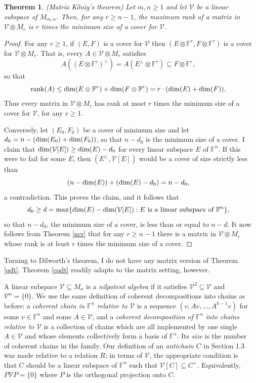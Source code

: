 \documentclass{amsart}
\newtheorem{thm}{Theorem}[section]
\theoremstyle{definition}
\begin{document}
\begin{thm}\label{mkt} (Matrix Kőnig's theorem)
Let $m,n \geq 1$ and let $\mathcal{V}$ be a linear subspace of $M_{m,n}$. Then, for any $r \geq n - 1$, the maximum rank of a matrix in $\mathcal{V} \otimes M_r$ is $r$ times the minimum size of a cover for $\mathcal{V}$.
\end{thm}

\begin{proof}
For any $r \geq 1$, if $(E,F)$ is a cover for $\mathcal{V}$ then $(E\otimes \mathbb{F}^r, F\otimes \mathbb{F}^r)$ is a cover for $\mathcal{V}\otimes M_r$. That is, every $A \in \mathcal{V}\otimes M_r$ satisfies $$A((E\otimes \mathbb{F}^r)^\perp) = A(E^\perp\otimes \mathbb{F}^r) \subseteq F\otimes \mathbb{F}^r,$$ so that $${\rm rank}(A) \leq {\rm dim}(E\otimes \mathbb{F}^r) + {\rm dim}(F\otimes \mathbb{F}^r) = r\cdot ({\rm dim}(E) + {\rm dim}(F)).$$ Thus every matrix in $\mathcal{V} \otimes M_r$ has rank at most $r$ times the minimum size of a cover for $\mathcal{V}$, for any $r \geq 1$.

Conversely, let $(E_0,F_0)$ be a cover of minimum size and let $d_0 = n - ({\rm dim}(E_0) + {\rm dim}(F_0))$, so that $n - d_0$ is the minimum size of a cover. I claim that ${\rm dim}(\mathcal{V}[E]) \geq {\rm dim}(E) - d_0$ for every linear subspace $E$ of $\mathbb{F}^n$. If this were to fail for some $E$, then $(E^\perp, \mathcal{V}[E])$ would be a cover of size strictly less than $$(n - {\rm dim}(E)) + ({\rm dim}(E) - d_0) = n - d_0,$$ a contradiction. This proves the claim, and it follows that $$d_0 \geq d = \max\{{\rm dim}(E) - {\rm dim}(\mathcal{V}[E]): E\mbox{ is a linear subspace of }\mathbb{F}^n\},$$ so that $n - d_0$, the minimum size of a cover, is less than or equal to $n - d$. It now follows from Theorem \ref{ncr} that for any $r \geq n - 1$ there is a matrix in $\mathcal{V} \otimes M_r$ whose rank is at least $r$ times the minimum size of a cover.
\end{proof}

Turning to Dilworth's theorem, I do not have any matrix version of Theorem \ref{qdt}. Theorem \ref{cqdt} readily adapts to the matrix setting, however. 

A linear subspace $\mathcal{V} \subseteq M_n$ is a {\it nilpotent algebra} if it satisfies $\mathcal{V}^2 \subseteq \mathcal{V}$ and $\mathcal{V}^n = \{0\}$. We use the same definition of coherent decompositions into chains as before: a {\it coherent chain in $\mathbb{F}^n$ relative to $\mathcal{V}$} is a sequence $(v, Av, \ldots, A^{k-1}v)$ for some $v \in \mathbb{F}^n$ and some $A \in \mathcal{V}$, and a {\it coherent decomposition of $\mathbb{F}^n$ into chains relative to $\mathcal{V}$} is a collection of chains which are all implemented by one single $A \in \mathcal{V}$ and whose elements collectively form a basis of $\mathbb{F}^n$. Its {\it size} is the number of coherent chains in the family. Our definition of an {\it antichain} $C$ in Section 1.3 was made relative to a relation $R$; in terms of $\mathcal{V}$, the appropriate condition is that $C$ should be a linear subspace of $\mathbb{F}^n$ such that $\mathcal{V}[C] \subseteq C^\perp$. Equivalently, $P\mathcal{V}P = \{0\}$ where $P$ is the orthogonal projection onto $C$.
\end{document}
